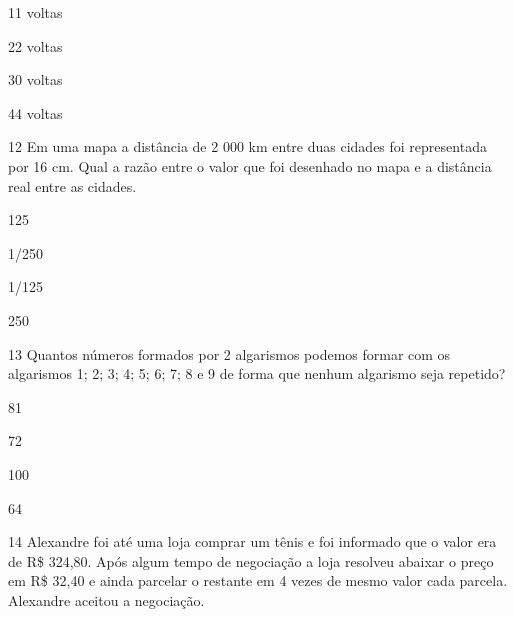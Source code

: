 \begin{escolha}
\item
  11 voltas
\item
  22 voltas
\item
  30 voltas
\item
  44 voltas
\end{escolha}


\num{12} Em uma mapa a distância de 2 000 km entre duas cidades foi
representada por 16 cm. Qual a razão entre o valor que foi desenhado no
mapa e a distância real entre as cidades.

\begin{escolha}
\item
  125
\item
  1/250
\item
  1/125
\item
  250
\end{escolha}


\num{13} Quantos números formados por 2 algarismos podemos formar com os
algarismos 1; 2; 3; 4; 5; 6; 7; 8 e 9 de forma que nenhum algarismo seja
repetido?

\begin{escolha}
\item
  81
\item
  72
\item
  100
\item
  64
\end{escolha}


\num{14} Alexandre foi até uma loja comprar um tênis e foi informado que o
valor era de R\$ 324,80. Após algum tempo de negociação a loja resolveu
abaixar o preço em R\$ 32,40 e ainda parcelar o restante em 4 vezes de
mesmo valor cada parcela. Alexandre aceitou a negociação.

